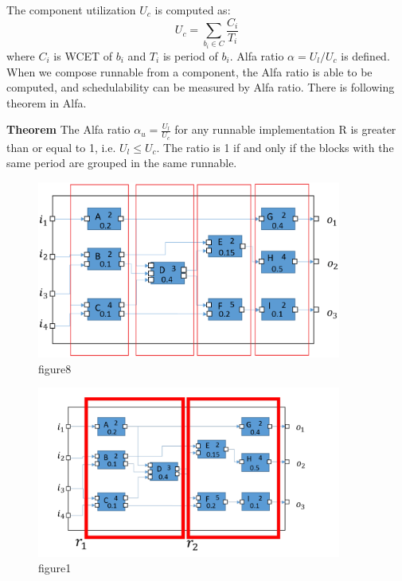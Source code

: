 \documentclass[conference,compsoc]{IEEEtran}
\begin{document}
The component utilization $U_c$ is computed as:
\begin{equation}
U_c = \sum_{b_i \in C} \frac{C_i}{T_i}
\end{equation}
where $C_i$ is WCET of $b_i$ and $T_i$ is period of $b_i$.
 Alfa ratio $\alpha = U_l/U_c$ is defined.
When we compose runnable from a component, the Alfa ratio is able to be computed, and schedulability can be measured by Alfa ratio.
There is following theorem in Alfa.

{\bf Theorem} The Alfa ratio $\alpha_u = \frac{U_l}{U_c}$ for any runnable implementation R is greater than or equal to 1, i.e. $U_l \le U_c$.
The ratio is 1 if and only if the blocks with the same period are grouped in the same runnable.

\begin{figure}
	\centering
	\includegraphics[width=10cm,clip]{figure1.eps}
	\caption{figure8}
	\label{fig8}
\end{figure}


\begin{figure}
	\centering
	\includegraphics[width=10cm,clip]{figure2.pdf}
	\caption{figure1}
	\label{fig9}
\end{figure}
\end{document}
